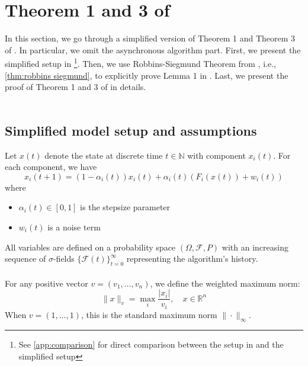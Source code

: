 \section{Theorem 1 and 3 of \cite{tsitsiklis1994asynchronous}}

In this section, we go through a simplified version of Theorem 1 and Theorem 3 of \cite{tsitsiklis1994asynchronous}. In particular, we omit the asynchronous algorithm part. First, we present the simplified setup in \cite{tsitsiklis1994asynchronous}\footnote{See \autoref{app:comparison} for direct comparison between the setup in \cite{tsitsiklis1994asynchronous} and the simplified setup}. Then, we use Robbins-Siegmund Theorem from \cite{robbins1971convergence}, i.e., \autoref{thm:robbins siegmund}, to explicitly prove Lemma 1 in \cite{tsitsiklis1994asynchronous}. Last, we present the proof of Theorem 1 and 3 of \cite{tsitsiklis1994asynchronous} in details.\\
\\
\subsection{Simplified model setup and assumptions}
Let $x(t)$ denote the state at discrete time $t\in\mathbb{N}$ with component $x_i(t)$. For each component, we have
$$
x_i(t+1) = (1-\alpha_i(t))x_i(t) + \alpha_i(t)(F_i(x(t)) + w_i(t)) 
$$
where
\begin{itemize}
    \item $\alpha_i(t) \in [0,1]$ is the stepsize parameter
    \item $w_i(t)$ is a noise term
\end{itemize}
All variables are defined on a probability space $(\Omega, \mathcal{F}, P)$ with an increasing sequence of $\sigma$-fields $\{\mathcal{F}(t)\}_{t=0}^{\infty}$ representing the algorithm's history. \\
\\
For any positive vector $v = (v_1, \ldots, v_n)$, we define the weighted maximum norm:
\begin{equation*}
\|x\|_v = \max_i \frac{|x_i|}{v_i}, \quad x \in \mathbb{R}^n
\end{equation*}
\noindent When $v = (1,\ldots,1)$, this is the standard maximum norm $\|\cdot\|_{\infty}$.\\
\noindent


